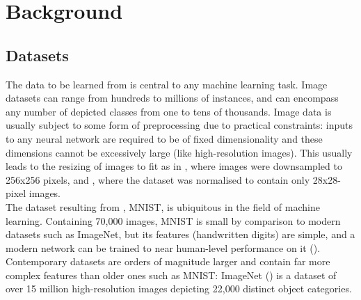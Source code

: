 
\chapter{Background}
\section{Datasets}
The data to be learned from is central to any machine learning task. Image datasets can range from hundreds to millions of instances, and can encompass any number of depicted classes from one to tens of thousands. Image data is usually subject to some form of preprocessing due to practical constraints: inputs to any neural network are required to be of fixed dimensionality and these dimensions cannot be excessively large (like high-resolution images). This usually leads to the resizing of images to fit as in \cite{Krizhevsky-2012}, where images were downsampled to 256x256 pixels, and \cite{LeCun-1998}, where the dataset was normalised to contain only 28x28-pixel images. \\

The dataset resulting from \cite{LeCun-1998}, MNIST, is ubiquitous in the field of machine learning. Containing 70,000 images, MNIST is small by comparison to modern datasets such as ImageNet, but its features (handwritten digits) are simple, and a modern network can be trained to near human-level performance on it (\cite{Krizhevsky-2012}). Contemporary datasets are orders of magnitude larger and contain far more complex features than older ones such as MNIST: ImageNet (\cite{imagenet_cvpr09_orig}) is a dataset of over 15 million high-resolution images depicting 22,000 distinct object categories. \\

